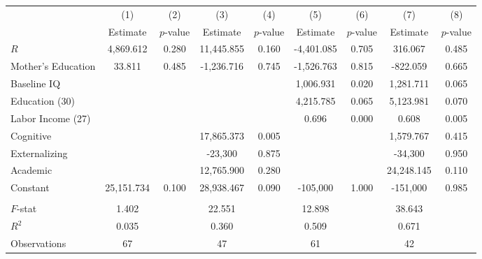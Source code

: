 \begin{tabular}{lcccccccc} \toprule
 & (1) & (2) & (3) & (4) & (5) & (6) & (7) & (8) \\ 
 & Estimate  & $p$-value  & Estimate  & $p$-value  & Estimate  & $p$-value  & Estimate  & $p$-value  \\  \midrule
$R$ &  4,869.612 &     0.280 & 11,445.855 &     0.160 & -4,401.085 &     0.705 &   316.067 &     0.485 \\  
Mother's Education &    33.811 &     0.485 & -1,236.716 &     0.745 & -1,526.763 &     0.815 &  -822.059 &     0.665 \\  
Baseline IQ &         &         &         &         &  1,006.931 &     0.020 &  1,281.711 &     0.065 \\  
Education (30) &         &         &         &         &  4,215.785 &     0.065 &  5,123.981 &     0.070 \\  
Labor Income (27) &         &         &         &         &     0.696 &     0.000 &     0.608 &     0.005 \\  
Cognitive &         &         & 17,865.373 &     0.005 &         &         &  1,579.767 &     0.415 \\  
Externalizing &         &         & -23,300 &     0.875 &         &         & -34,300 &     0.950 \\  
Academic &         &         & 12,765.900 &     0.280 &         &         & 24,248.145 &     0.110 \\  
Constant & 25,151.734 &     0.100 & 28,938.467 &     0.090 & -105,000 &     1.000 & -151,000 &     0.985 \\ \\ \midrule
$F$-stat &     1.402 &         &    22.551 &         &    12.898 &         &    38.643 &         \\  
$R^2$ &     0.035 &         &     0.360 &         &     0.509 &         &     0.671 &         \\  
Observations &    67 &         &    47 &         &    61 &         &    42 &         \\  
\bottomrule
\end{tabular}

